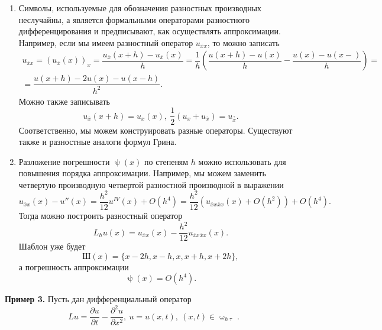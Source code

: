 \documentclass[a4paper, 12pt]{report}
\numberwithin{equation}{section}
\newcommand{\ol}{\overline}
\renewcommand{\tau}{\uptau}
\renewcommand{\psi}{\uppsi}
\renewcommand{\omega}{\upomega}
\renewcommand{\d}{\partial}
\begin{document}
\begin{enumerate}
\item Символы, используемые для обозначения разностных производных неслучайны, а является формальными операторами разностного дифференцирования и предписывают, как осуществлять аппроксимации. Например, если мы имеем разностный оператор $u_{\ol x x}$, то можно записать
\begin{multline*}
	u_{\ol x x} = (u_{\ol x}(x))_x = \dfrac{u_{\ol x}(x+h) - u_{\ol x}(x)}{h} = \dfrac{1}{h}\left(\dfrac{u(x+h) - u(x)}{h} - \dfrac{u(x) - u(x-)}{h}\right) =\\= \dfrac{u(x+h) - 2u(x) - u(x-h)}{h^2}.
\end{multline*}
Можно также записывать $$u_{\ol x}(x+h) = u_x(x),\ \dfrac12 (u_x + u_{\ol x}) = u_{ \overset{\circ}{x}}.$$ Соответственно, мы можем конструировать разные операторы. Существуют также и разностные аналоги формул Грина.
\item Разложение погрешности $\psi(x)$ по степеням $h$ можно использовать для повышения порядка аппроксимации. Например, мы можем заменить четвертую производную четвертой разностной производной в выражении $$u_{\ol x x}(x) - u''(x) = \dfrac{h^2}{12} u^{IV}(x) + O(h^4) = \dfrac{h^2}{12}\left(u_{\ol x x\ol x x}(x) + O(h^2)\right) + O(h^4).$$
Тогда можно построить разностный оператор $$L_hu(x) = u_{\ol x x}(x) - \dfrac{h^2}{12} u_{\ol x x\ol x x}(x).$$
Шаблон уже будет $$\text{Ш}(x) = \{x-2h, x-h, x, x+h, x+2h\},$$ а погрешность аппроксимации $$\psi(x) = O(h^4).$$
\end{enumerate}
\textbf{Пример 3.} Пусть дан дифференциальный оператор $$Lu = \dfrac{\d u}{\d t} - \dfrac{\d ^2 u}{\d x ^2},\ u=u(x,t),\ (x,t) \in \omega_{h\tau}.$$
\end{document}
